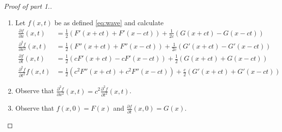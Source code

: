 \begin{proof}[Proof of part 1.]
    \begin{enumerate}
        \item Let \(f(x,t)\) be as defined \eqref{eq:wave} and calculate
              \[
                  \begin{aligned}
                      \tfrac{\partial f}{\partial x} (x,t)
                       & = \tfrac{1}{2} \left(F'(x+ct) + F'(x-ct)\right)
                      + \tfrac{1}{2c}\left(G(x+ct) - G(x-ct)\right)               \\
                      \tfrac{\partial^2 f}{\partial x^2}(x,t)
                       & = \tfrac{1}{2} \left(F''(x+ct) + F''(x-ct)\right)
                      + \tfrac{1}{2c}\left(G'(x+ct) - G'(x-ct)\right)             \\
                      \tfrac{\partial f}{\partial t} (x,t)
                       & = \tfrac{1}{2} \left(cF'(x+ct) - c F'(x-ct)\right)
                      + \tfrac{1}{2}\left(G(x+ct) + G(x-ct)\right)                \\
                      \tfrac{\partial^2 f}{\partial t^2} f(x,t)
                       & = \tfrac{1}{2} \left(c^2F''(x+ct) + c^2 F''(x-ct)\right)
                      + \tfrac{c}{2}\left(G'(x+ct) + G'(x-ct)\right)
                  \end{aligned}
              \]
        \item Observe that  \(   \frac{\partial^2 f}{\partial x^2}(x,t) = c^2  \frac{\partial^2 f}{\partial t^2}(x,t) \).
        \item Observe that \(f(x,0) = F(x)\)
              and \(\frac{\partial f}{\partial t}(x,0) = G(x)\).
    \end{enumerate}
\end{proof}


